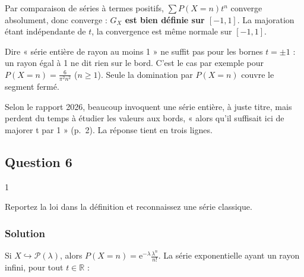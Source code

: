 \documentclass[11pt,a4paper]{article}
\newcommand{\equationajustee}[1]{%
  \sbox{\boiteequation}{$\displaystyle #1$}%
  \ifdim\wd\boiteequation>\linewidth
    \[\resizebox{\linewidth}{!}{\usebox{\boiteequation}}\]%
  \else
    \[#1\]%
  \fi}
\begin{document}
Par comparaison de séries à termes positifs, \(\sum P(X=n)t^n\) converge absolument, donc converge : \textbf{\(G_X\) est bien définie sur \([-1,1]\)}. La majoration étant indépendante de \(t\), la convergence est même normale sur \([-1,1]\).

\begin{piege}

Dire « série entière de rayon au moins 1 » ne suffit pas pour les bornes \(t=\pm1\) : un rayon égal à 1 ne dit rien sur le bord. C'est le cas par exemple pour \(P(X=n)=\frac{6}{\pi^2n^2}\) (\(n\ge1\)). Seule la domination par \(P(X=n)\) couvre le segment fermé.

\end{piege}

\begin{jury}

Selon le rapport 2026, beaucoup invoquent une série entière, à juste titre, mais perdent du temps à étudier les valeurs aux bords, « alors qu'il suffisait ici de majorer t par 1 » (p.~2). La réponse tient en trois lignes.

\end{jury}

\hypertarget{question-6}{%
\subsection{Question 6}\label{question-6}}

\begin{indication}{1}

Reportez la loi dans la définition et reconnaissez une série classique.

\end{indication}

\hypertarget{solution-5}{%
\subsubsection{Solution}\label{solution-5}}

Si \(X\hookrightarrow\mathcal{P}(\lambda)\), alors \(P(X=n)={\mathrm{e}}^{-\lambda}\frac{\lambda^n}{n!}\). La série exponentielle ayant un rayon infini, pour tout \(t\in\mathbb{R}\) :

\equationajustee{\begin{aligned}
G_X(t)&={\mathrm{e}}^{-\lambda}\sum_{n=0}^{+\infty}\frac{(\lambda t)^n}{n!}\\
&={\mathrm{e}}^{-\lambda}{\mathrm{e}}^{\lambda t}.
\end{aligned}}
\end{document}

